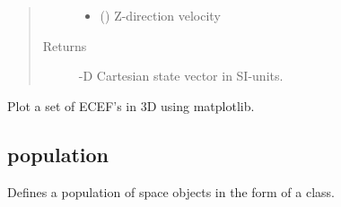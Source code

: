 \documentclass[letterpaper,10pt,english]{sphinxmanual}
\begin{document}
\begin{fulllineitems}
\begin{fulllineitems}
\begin{quote}
\begin{description}
\begin{itemize}
\item {} 
 () \textendash{} Z-direction velocity

\end{itemize}

\item[{Returns}] -D Cartesian state vector in SI-units.

\end{description}\end{quote}

\end{fulllineitems}


\end{fulllineitems}


\begin{fulllineitems}
\label{\detokenize{modules/propagator_base:propagator_base.plot_orbit_3d}}
Plot a set of ECEF’s in 3D using matplotlib.

\end{fulllineitems}



\subsection{population}
\label{\detokenize{modules/population:module-population}}\label{\detokenize{modules/population:population}}\label{\detokenize{modules/population::doc}}
Defines a population of space objects in the form of a class.
\end{document}
